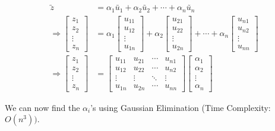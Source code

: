 \documentclass[11pt, a4paper]{article}
\begin{document}
\begin{align*}
\utilde{z} &= \alpha_1 \utilde{u_1} + \alpha_2 \utilde{u_2} + \cdots + \alpha_n \utilde{u_n} \\[1.5em]
\Rightarrow \begin{bmatrix}
z_1 \\
z_2 \\
\vdots \\
z_n
\end{bmatrix}
&=
\alpha_1
\begin{bmatrix}
u_{11} \\
u_{12} \\
\vdots \\
u_{1n}
\end{bmatrix}
+
\alpha_2
\begin{bmatrix}
u_{21} \\
u_{22} \\
\vdots \\
u_{2n}
\end{bmatrix}
+ \cdots +
\alpha_n
\begin{bmatrix}
u_{n1} \\
u_{n2} \\
\vdots \\
u_{nn}
\end{bmatrix}
\\[1.5em]
\Rightarrow \begin{bmatrix}
z_1 \\
z_2 \\
\vdots \\
z_n
\end{bmatrix}
&=
\begin{bmatrix}
u_{11} & u_{21} & \cdots & u_{n1} \\
u_{12} & u_{22} & \cdots & u_{n2} \\
\vdots & \vdots & \ddots & \vdots \\
u_{1n} & u_{2n} & \cdots & u_{nn}
\end{bmatrix}
\begin{bmatrix}
\alpha_1 \\
\alpha_2 \\
\vdots \\
\alpha_n
\end{bmatrix}
\end{align*}

We can now find the $\alpha_i$'s using Gaussian Elimination (Time Complexity: $O(n^3))$. \\

\vspace{0.3cm}
\end{document}
